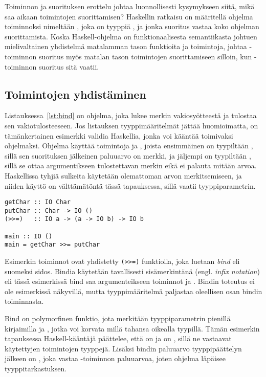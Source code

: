 \documentclass[finnish]{tktltiki2}
\begin{document}
Toiminnon ja suorituksen erottelu johtaa luonnollisesti kysymykseen siitä, mikä saa aikaan
toimintojen suorittamisen? Haskellin ratkaisu on määritellä ohjelma toiminnoksi nimeltään
, joka on tyyppiä , ja jonka suoritus vastaa koko ohjelman suorittamista.
Koska Haskell-ohjelma on funktionaalisesta semantiikasta johtuen mielivaltainen yhdistelmä
matalamman tason funktioita ja toimintoja, johtaa -toiminnon suoritus myös matalan tason
toimintojen suorittamiseen silloin, kun -toiminnon suoritus sitä vaatii.

\subsection{Toimintojen yhdistäminen}

Listauksessa~\ref{lst:bind} on ohjelma, joka lukee merkin vakiosyötteestä ja tulostaa sen
vakiotulosteeseen. Jos listauksen tyyppimääritelmät jättää huomioimatta, on tämänkertainen esimerkki
validia Haskellia, jonka voi kääntää toimivaksi ohjelmaksi. Ohjelma käyttää toimintoja  ja
, joista ensimmäinen on tyypiltään , sillä sen suorituksen
jälkeinen paluuarvo on merkki, ja jäljempi on tyypiltään , sillä se ottaa
argumentikseen tulostettavan merkin eikä ei palauta mitään arvoa. Haskellissa tyhjiä sulkeita
käytetään olemattoman arvon merkitsemiseen, ja niiden käyttö on välttämätöntä tässä tapauksessa,
sillä  vaatii tyyppiparametrin.

\begin{lstlisting}[float,label={lst:bind},caption={Kompositio ja sidosfunktion käyttö}]
getChar :: IO Char
putChar :: Char -> IO ()
(>>=)   :: IO a -> (a -> IO b) -> IO b

main :: IO ()
main = getChar >>= putChar
\end{lstlisting}


Esimerkin toiminnot ovat yhdistetty \verb|(>>=)| funktiolla, joka luetaan \emph{bind} eli suomeksi
sidos. Bindia käytetään tavallisesti sisämerkintänä (engl. \emph{infix notation}) eli tässä esimerkissä
bind saa argumenteikseen toiminnot  ja . Bindin toteutus ei ole
esimerkissä näkyvillä, mutta tyyppimääritelmä paljastaa oleellisen osan bindin toiminnasta.

Bind on polymorfinen funktio, jota merkitään tyyppiparametrin pienillä kirjaimilla  ja
, jotka voi korvata millä tahansa oikealla tyypillä. Tämän esimerkin tapauksessa
Haskell-kääntäjä päättelee, että  on  ja  on \code{()}, sillä ne
vastaavat käytettyjen toimintojen tyyppejä. Lisäksi bindin paluuarvo tyyppipäättelyn jälkeen on
, joka vastaa -toiminnon paluuarvoa, joten ohjelma läpäisee
tyyppitarkastuksen.
\end{document}
